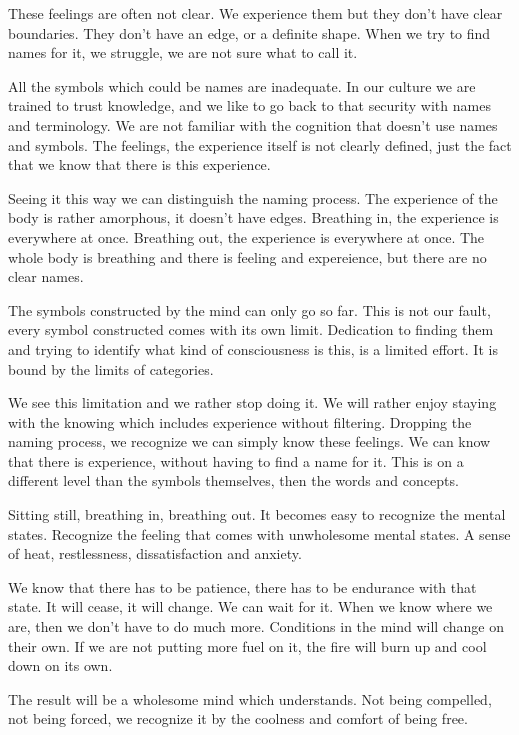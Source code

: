 These feelings are often not clear. We experience them but they don't
have clear boundaries. They don't have an edge, or a definite shape.
When we try to find names for it, we struggle, we are not sure what to
call it.

All the symbols which could be names are inadequate. In our culture we
are trained to trust knowledge, and we like to go back to that security
with names and terminology. We are not familiar with the cognition that
doesn't use names and symbols. The feelings, the experience itself is
not clearly defined, just the fact that we know that there is this
experience.

Seeing it this way we can distinguish the naming process. The experience
of the body is rather amorphous, it doesn't have edges. Breathing in,
the experience is everywhere at once. Breathing out, the experience is
everywhere at once. The whole body is breathing and there is feeling and
expereience, but there are no clear names.

The symbols constructed by the mind can only go so far. This is not our
fault, every symbol constructed comes with its own limit. Dedication to
finding them and trying to identify what kind of consciousness is this,
is a limited effort. It is bound by the limits of categories.

We see this limitation and we rather stop doing it. We will rather enjoy
staying with the knowing which includes experience without filtering.
Dropping the naming process, we recognize we can simply know these
feelings. We can know that there is experience, without having to find a
name for it. This is on a different level than the symbols themselves,
then the words and concepts.

Sitting still, breathing in, breathing out. It becomes easy to recognize
the mental states. Recognize the feeling that comes with unwholesome
mental states. A sense of heat, restlessness, dissatisfaction and
anxiety.

We know that there has to be patience, there has to be endurance with
that state. It will cease, it will change. We can wait for it. When we
know where we are, then we don't have to do much more. Conditions in the
mind will change on their own. If we are not putting more fuel on it,
the fire will burn up and cool down on its own.

The result will be a wholesome mind which understands. Not being
compelled, not being forced, we recognize it by the coolness and comfort
of being free.

